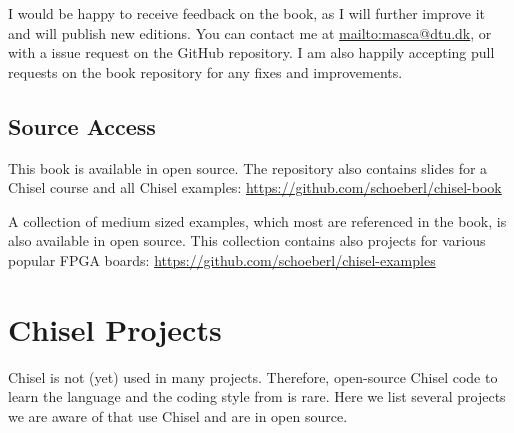 \documentclass[%
    10pt,
    headinclude, footexclude,
    openright, %
    notitlepage,
    cleardoubleempty,
    headsepline,
    pointlessnumbers,
    bibtotoc, idxtotoc,
    ]{scrbook}
\begin{document}
I would be happy to receive feedback on the book, as I will further
improve it and will publish new editions. You can contact me at
\url{mailto:masca@dtu.dk}, or with a issue request on the GitHub
repository. I am also happily accepting pull requests
on the book repository for any fixes and improvements.

\section*{Source Access}

This book is available in open source.
The repository also contains slides for a Chisel course and
all Chisel examples: \url{https://github.com/schoeberl/chisel-book}

A collection of medium sized examples, which most are referenced
in the book, is also available in open source. This collection
contains also projects for various popular FPGA boards:
\url{https://github.com/schoeberl/chisel-examples}

\appendix

\chapter{Chisel Projects}

Chisel is not (yet) used in many projects. Therefore, open-source Chisel code
to learn the language and the coding style from is rare. Here we list several projects
we are aware of that use Chisel and are in open source.
\end{document}
